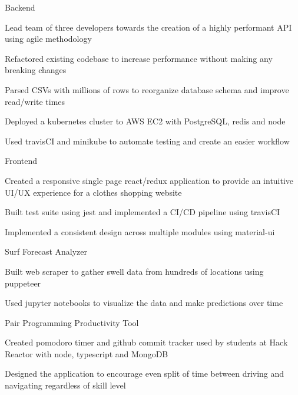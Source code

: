 
\begin{cventries}
  \cventry
    {} %
    {Backend} %
    {} %
    {} %
    {
      \begin{cvitems} %
        \item {Lead team of three developers towards the creation of a highly performant API using agile methodology}
        \item {Refactored existing codebase to increase performance without making any breaking changes}
		\item {Parsed CSVs with millions of rows to reorganize database schema and improve read/write times}
		\item {Deployed a kubernetes cluster to AWS EC2 with PostgreSQL, redis and node}
		\item {Used travisCI and minikube to automate testing and create an easier workflow}
      \end{cvitems}
    }
  
  \cventry
    {} %
    {Frontend} %
    {} %
    {} %
    {
      \begin{cvitems} %
		\item {Created a responsive single page react/redux application to provide an intuitive UI/UX experience for a clothes shopping website}
		\item {Built test suite using jest and implemented a CI/CD pipeline using travisCI}
		\item {Implemented a consistent design across multiple modules using material-ui}
      \end{cvitems}
    }

  \cventry
    {} %
    {Surf Forecast Analyzer} %
    {} %
    {} %
    {
      \begin{cvitems} %
      	\item {Built web scraper to gather swell data from hundreds of locations using puppeteer}
		\item {Used jupyter notebooks to visualize the data and make predictions over time}
      \end{cvitems}
    }
    
  \cventry
    {} %
    {Pair Programming Productivity Tool} %
    {} %
    {} %
    {
      \begin{cvitems} %
      	\item {Created pomodoro timer and github commit tracker used by students at Hack Reactor with node, typescript and MongoDB}
      	\item {Designed the application to encourage even split of time between driving and navigating regardless of skill level}
      	\items 
      \end{cvitems}
    }
\end{cventries}